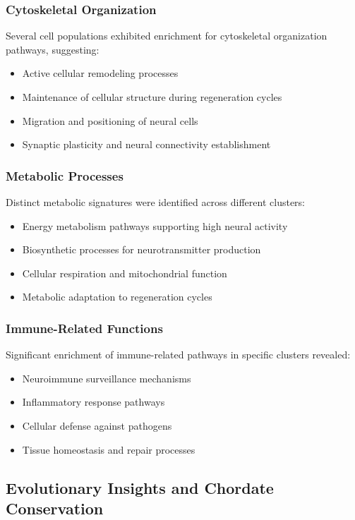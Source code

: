 \documentclass[12pt,a4paper]{article}
\begin{document}
\subsubsection{Cytoskeletal Organization}
Several cell populations exhibited enrichment for cytoskeletal organization pathways, suggesting:

\begin{itemize}
\item Active cellular remodeling processes
\item Maintenance of cellular structure during regeneration cycles
\item Migration and positioning of neural cells
\item Synaptic plasticity and neural connectivity establishment
\end{itemize}

\subsubsection{Metabolic Processes}
Distinct metabolic signatures were identified across different clusters:

\begin{itemize}
\item Energy metabolism pathways supporting high neural activity
\item Biosynthetic processes for neurotransmitter production
\item Cellular respiration and mitochondrial function
\item Metabolic adaptation to regeneration cycles
\end{itemize}

\subsubsection{Immune-Related Functions}
Significant enrichment of immune-related pathways in specific clusters revealed:

\begin{itemize}
\item Neuroimmune surveillance mechanisms
\item Inflammatory response pathways
\item Cellular defense against pathogens
\item Tissue homeostasis and repair processes
\end{itemize}

\subsection{Evolutionary Insights and Chordate Conservation}
\end{document}
